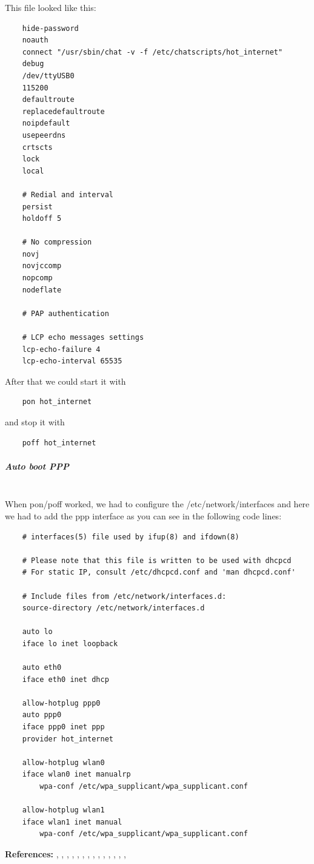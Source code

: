 This file looked like this:
\begin{verbatim}
	hide-password
	noauth
	connect "/usr/sbin/chat -v -f /etc/chatscripts/hot_internet"
	debug
	/dev/ttyUSB0
	115200
	defaultroute
	replacedefaultroute
	noipdefault
	usepeerdns
	crtscts
	lock
	local
	 
	# Redial and interval
	persist
	holdoff 5
	 
	# No compression
	novj
	novjccomp
	nopcomp
	nodeflate
		 
	# PAP authentication
	 
	# LCP echo messages settings
	lcp-echo-failure 4
	lcp-echo-interval 65535
\end{verbatim}
After that we could start it with 
\begin{verbatim}
	pon hot_internet
\end{verbatim}
and stop it with 
\begin{verbatim}
	poff hot_internet
\end{verbatim}
\subparagraph{Auto boot PPP}\mbox{}\\
When pon/poff worked, we had to configure the /etc/network/interfaces and here we had to add the ppp interface as you can see in the following code lines:
\begin{verbatim}
	# interfaces(5) file used by ifup(8) and ifdown(8)
	 
	# Please note that this file is written to be used with dhcpcd
	# For static IP, consult /etc/dhcpcd.conf and 'man dhcpcd.conf'
 
	# Include files from /etc/network/interfaces.d:
	source-directory /etc/network/interfaces.d
	 
	auto lo
	iface lo inet loopback
	 
	auto eth0
	iface eth0 inet dhcp
	 
	allow-hotplug ppp0
	auto ppp0
	iface ppp0 inet ppp
	provider hot_internet
	 
	allow-hotplug wlan0
	iface wlan0 inet manualrp
	    wpa-conf /etc/wpa_supplicant/wpa_supplicant.conf
	 
	allow-hotplug wlan1
	iface wlan1 inet manual
	    wpa-conf /etc/wpa_supplicant/wpa_supplicant.conf
\end{verbatim}
\textbf{References:} \cite{gpsd}, \cite{USBModeSwitch}, \cite{GSMmobile}, \cite{USBModemStickMedion}, \cite{PPPunderUbuntu}, \cite{USBSurfstick}, \cite{Reboot}, \cite{DaemonizeJavaApplications}, \cite{raspberrypi}, \cite{Tastaturlayout}, \cite{TightVNCServer}, \cite{RaspberryPiGPS}, \cite{gpsbable}, \cite{autostartScript}, \cite{wlan}
\newpage
